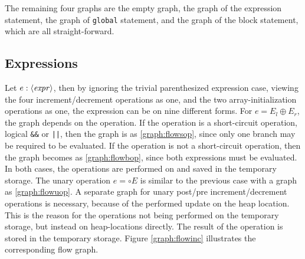 The remaining four graphs are the empty graph, the graph of the expression statement, the graph of \texttt{global} statement, and the graph of the block statement, which are all straight-forward.


\subsection{Expressions}

Let $e : \langle\mathit{expr}\rangle$, then by ignoring the trivial parenthesized expression case, viewing the four increment/decrement operations as one, and the two array-initialization operations as one, the expression can be on nine different forms. For $e = E_l \oplus E_r$, the graph depends on the operation. If the operation is a short-circuit operation, logical \texttt{\&\&} or \texttt{||}, then the graph is as \ref{graph:flowsop}, since only one branch may be required to be evaluated. If the operation is not a short-circuit operation, then the graph becomes as \ref{graph:flowbop}, since both expressions must be evaluated. In both cases, the operations are performed on and saved in the temporary storage. The unary operation $e = \circ E$ is similar to the previous case with a graph as \ref{graph:flowuop}. A separate graph for unary post/pre increment/decrement operations is necessary, because of the performed update on the heap location. This is the reason for the operations not being performed on the temporary storage, but instead on heap-locations directly. The result of the operation is stored in the temporary storage. Figure \ref{graph:flowinc} illustrates the corresponding flow graph.
